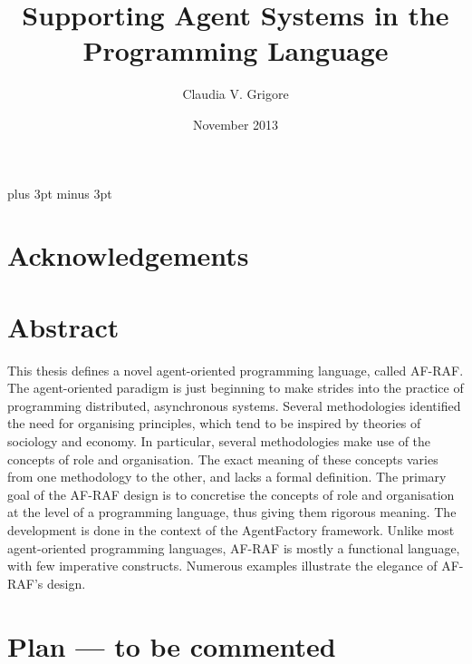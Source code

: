 \documentclass[a4paper,12pt,oneside,fleqn]{book} %
\theoremstyle{plain}
\theoremstyle{definition}
\theoremstyle{remark}
\begin{document}
\overfullrule=5pt   %
\title{Supporting Agent Systems in the Programming Language} %
\author{Claudia V. Grigore}
\date{November 2013}
\maketitle

\tableofcontents
\listoffigures
\listoftables
\baselineskip=21.75pt
\parskip=3pt plus 3pt minus 3pt
\chapter*{Acknowledgements} %


\chapter*{Abstract} %

This thesis defines a novel agent-oriented programming language, called
AF-RAF\null.  The agent-oriented paradigm is just beginning to make strides
into the practice of programming distributed, asynchronous systems.
Several methodologies identified the need for organising principles, which
tend to be inspired by theories of sociology and economy.  In particular,
several methodologies make use of the concepts of role and organisation.
The exact meaning of these concepts varies from one methodology to the
other, and lacks a formal definition.  The primary goal of the AF-RAF
design is to concretise the concepts of role and organisation at the level
of a programming language, thus giving them rigorous meaning. The
development is done in the context of the AgentFactory framework.  Unlike
most agent-oriented programming languages, AF-RAF is mostly a functional
language, with few imperative constructs.  Numerous examples illustrate the
elegance of AF-RAF's design.



\chapter*{Plan --- to be commented} %
\end{document}
